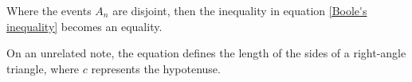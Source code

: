 

Where the events $A_n$ are disjoint, then the inequality
in equation \ref{Boole's inequality} becomes an equality.


On an unrelated note, the equation defines the length of
the sides of a right-angle triangle, where $c$ represents the hypotenuse.
